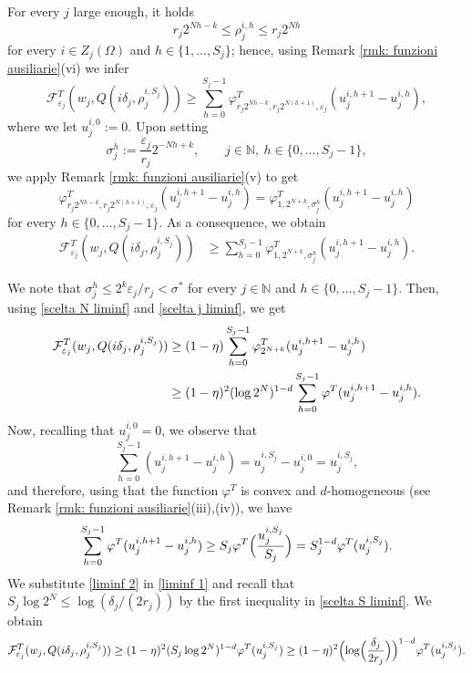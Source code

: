 \documentclass{article}
\theoremstyle{plain}
\theoremstyle{definition}
\def\NN{{\mathbb N}}
\newcommand{\f}{\varphi}
\newcommand{\ej}{\varepsilon_j}
\newcommand{\rj}{r_j}
\newcommand{\s}{\sigma}
\newcommand{\sj}{\sigma_j}
\newcommand{\dej}{\delta_j}
\newcommand{\F}{\mathcal{F}}
\numberwithin{equation}{section}
\begin{document}
For every $j$ large enough, it holds
\begin{equation*}
    \rj 2^{Nh-k}\leq \rho^{i,h}_j\leq \rj2^{Nh}
\end{equation*}
for every $i\in Z_j(\Omega)$ and $h\in\{1,\dots, S_j\}$; hence, using Remark \ref{rmk: funzioni ausiliarie}(vi) we infer
\begin{equation*}
    \F^T_{\ej}(w_j, Q(i\delta_{j},\rho^{i, S_j}_{j}))\geq \sum_{h=0}^{S_j-1} \f^T_{\rj2^{Nh-k}, \rj2^{N(h+1)},\ej}(u_j^{i,h+1}-u_j^{i,h}),
\end{equation*}
where we let $u_j^{i,0}:=0$. Upon setting 
\begin{equation*}
    \sj^h:=\frac{\ej}{\rj}2^{-Nh+k}, \qquad j\in\NN, \ h\in\{0,\dots,S_j-1\},
\end{equation*}
we apply Remark \ref{rmk: funzioni ausiliarie}(v) to get 
\begin{equation*}
    \f^T_{\rj2^{Nh-k}, \rj2^{N(h+1)},\ej}(u_j^{i,h+1}-u_j^{i,h})= \f^T_{1, 2^{N+k},\sj^h}(u_j^{i,h+1}-u_j^{i,h})
\end{equation*}
for every $h\in\{0,\dots, S_j-1\}$. As a consequence, we obtain
\begin{align*}
      \F^T_{\ej}(w_j, Q(i\delta_{j},\rho^{i, S_j}_{j}))& \geq  \sum_{h=0}^{S_j-1} \f^T_{1, 2^{N+k},\sj^h}(u_j^{i,h+1}-u_j^{i,h}).
\end{align*}

We note that $\sj^h\leq 2^k\ej/\rj<\s^*$ for every $j\in\NN$ and $h\in\{0,\dots,S_j-1\}$. Then, using \eqref{scelta N liminf} and \eqref{scelta j liminf}, we get
\begin{align}\notag
 \F^T_{\ej}(w_j, Q(i\delta_{j},\rho^{i, S_j}_{j})) 
 & \geq  (1-\eta)\sum_{h=0}^{S_j-1} \f_{2^{N+k}}^T(u_j^{i,h+1}-u_j^{i,h})
\\ \label{liminf 1}
   & \geq (1-\eta)^2 (\log 2^N)^{1-d}\sum_{h=0}^{S_j-1}\f^T(u_j^{i,h+1}-u_j^{i,h}).
 \end{align}
Now, recalling that $u^{i,0}_j=0$, we observe that
\begin{equation*}
    \sum_{h=0}^{S_j-1} (u_j^{i,h+1}-u_j^{i,h})=u^{i,S_j}_j-u^{i,0}_j=u^{i,S_j}_j,
\end{equation*}
 and therefore, using that the function $\f^T$ is convex and $d$-homogeneous (see Remark \ref{rmk: funzioni ausiliarie}(iii),(iv)), we have
 \begin{equation}\label{liminf 2}
     \sum_{h=0}^{S_j-1}\f^T(u_j^{i,h+1}-u_j^{i,h}) \geq S_j \f^T\Bigl(\frac{u_j^{i,S_j}}{S_j}\Bigr)=S_j^{1-d}\f^T(u_j^{i,S_j}).
 \end{equation}
We substitute \eqref{liminf 2} in \eqref{liminf 1} and recall that $S_j\log 2^N\leq \log(\dej/(2\rj))$  by the first inequality in \eqref{scelta S liminf}. We obtain
 \begin{equation*}
 \F^T_{\ej}(w_j, Q(i\delta_{j},\rho^{i, S_j}_{j})) \geq (1-\eta)^2 (S_j\log 2^N)^{1-d}\f^T(u_j^{i,S_j}) \geq (1-\eta)^2 \Bigl(\log\Bigl(\frac{\dej}{2\rj}\Bigr)\Bigr)^{1-d}\f^T(u_j^{i,S_j}).
\end{equation*}
\end{document}
